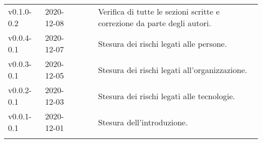 {\begin{longtable}{C{.131777\freewidth} C{.134036\freewidth} C{.263554\freewidth} C{.188254\freewidth} C{.282379\freewidth}}
		v0.1.0-0.2 & 2020-12-08 & \Davide & \ver{} & Verifica di tutte le sezioni scritte e correzione da parte degli autori. \\
		v0.0.4-0.1 & 2020-12-07 & \Matteo{} & \ana{} & Stesura dei rischi legati alle persone. \\
		v0.0.3-0.1 & 2020-12-05 & \Matteo{} & \ana{} & Stesura dei rischi legati all'organizzazione. \\
		v0.0.2-0.1 & 2020-12-03 & \Matteo{} & \ana{} & Stesura dei rischi legati alle tecnologie. \\
		v0.0.1-0.1 & 2020-12-01 & \Tommaso{} & \ana{} & Stesura dell'introduzione. \\
		
		\bottomrule
		\hiderowcolors
	\end{longtable}
}
